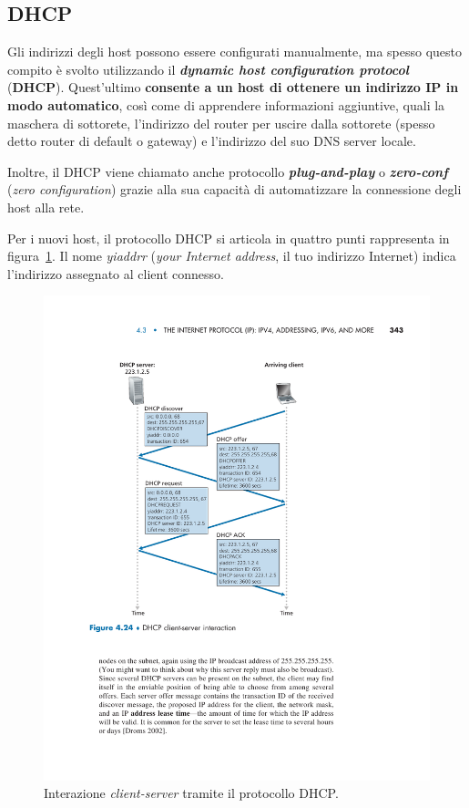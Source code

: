 \documentclass[a4paper]{article}
\begin{document}
	\subsection{DHCP}
	
	Gli indirizzi degli host possono essere configurati manualmente, ma spesso questo compito è svolto utilizzando il \textcolor{Red3}{\textbf{\emph{dynamic host configuration protocol}}} (\textbf{DHCP}). Quest’ultimo \textbf{consente a un host di ottenere un indirizzo IP in modo automatico}, così come di apprendere informazioni aggiuntive, quali la maschera di sottorete, l’indirizzo del router per uscire dalla sottorete (spesso detto router di default o gateway) e l’indirizzo del suo DNS server locale.\newline
	
	\noindent
	Inoltre, il DHCP viene chiamato anche protocollo \textbf{\emph{plug-and-play}} o \textbf{\emph{zero-conf}} (\emph{zero configuration}) grazie alla sua capacità di automatizzare la connessione degli host alla rete.\newline
	
	\noindent
	Per i nuovi host, il protocollo DHCP si articola in quattro punti rappresenta in figura~\ref{DHCP immagine}. Il nome \emph{yiaddrr} (\emph{your Internet address}, il tuo indirizzo Internet) indica l'indirizzo assegnato al client connesso.
	\begin{figure}[!htp]
		\centering
		\includegraphics[width=\textwidth]{img/DHCP.pdf}
		\caption{Interazione \emph{client-server} tramite il protocollo DHCP.}\label{DHCP immagine}
	\end{figure}\newpage
	
\end{document}
